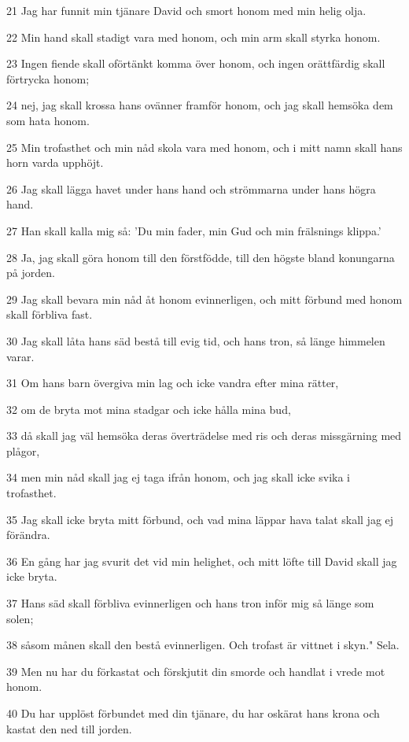 \par 21 Jag har funnit min tjänare David och smort honom med min helig olja.
\par 22 Min hand skall stadigt vara med honom, och min arm skall styrka honom.
\par 23 Ingen fiende skall oförtänkt komma över honom, och ingen orättfärdig skall förtrycka honom;
\par 24 nej, jag skall krossa hans ovänner framför honom, och jag skall hemsöka dem som hata honom.
\par 25 Min trofasthet och min nåd skola vara med honom, och i mitt namn skall hans horn varda upphöjt.
\par 26 Jag skall lägga havet under hans hand och strömmarna under hans högra hand.
\par 27 Han skall kalla mig så: 'Du min fader, min Gud och min frälsnings klippa.'
\par 28 Ja, jag skall göra honom till den förstfödde, till den högste bland konungarna på jorden.
\par 29 Jag skall bevara min nåd åt honom evinnerligen, och mitt förbund med honom skall förbliva fast.
\par 30 Jag skall låta hans säd bestå till evig tid, och hans tron, så länge himmelen varar.
\par 31 Om hans barn övergiva min lag och icke vandra efter mina rätter,
\par 32 om de bryta mot mina stadgar och icke hålla mina bud,
\par 33 då skall jag väl hemsöka deras överträdelse med ris och deras missgärning med plågor,
\par 34 men min nåd skall jag ej taga ifrån honom, och jag skall icke svika i trofasthet.
\par 35 Jag skall icke bryta mitt förbund, och vad mina läppar hava talat skall jag ej förändra.
\par 36 En gång har jag svurit det vid min helighet, och mitt löfte till David skall jag icke bryta.
\par 37 Hans säd skall förbliva evinnerligen och hans tron inför mig så länge som solen;
\par 38 såsom månen skall den bestå evinnerligen. Och trofast är vittnet i skyn." Sela.
\par 39 Men nu har du förkastat och förskjutit din smorde och handlat i vrede mot honom.
\par 40 Du har upplöst förbundet med din tjänare, du har oskärat hans krona och kastat den ned till jorden.
